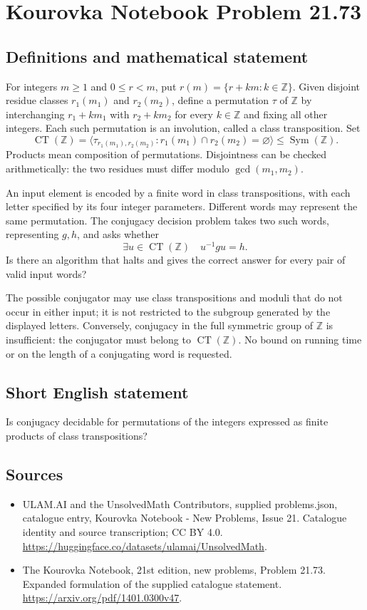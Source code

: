 \documentclass[11pt,a4paper]{article}
\begin{document}
\section*{Kourovka Notebook Problem 21.73}\label{statement}

\subsection{Definitions and mathematical statement}
For integers $m\ge1$ and $0\le r<m$, put
$r(m)=\{r+km:k\in\mathbb Z\}$. Given disjoint residue classes
$r_1(m_1)$ and $r_2(m_2)$, define a permutation $\tau$ of $\mathbb Z$
by interchanging $r_1+km_1$ with $r_2+km_2$ for every $k\in\mathbb Z$
and fixing all other integers. Each such permutation is an involution,
called a class transposition. Set
\[
 \operatorname{CT}(\mathbb Z)
  =\langle\tau_{r_1(m_1),r_2(m_2)}:
                      r_1(m_1)\cap r_2(m_2)=\varnothing\rangle
  \le\operatorname{Sym}(\mathbb Z).
\]
Products mean composition of permutations. Disjointness can be checked
arithmetically: the two residues must differ modulo
$\gcd(m_1,m_2)$.

An input element is encoded by a finite word in class transpositions,
with each letter specified by its four integer parameters. Different
words may represent the same permutation. The conjugacy decision
problem takes two such words, representing $g,h$, and asks whether
\[
 \exists u\in\operatorname{CT}(\mathbb Z)\quad u^{-1}gu=h.
\]
Is there an algorithm that halts and gives the correct answer for
every pair of valid input words?

The possible conjugator may use class transpositions and moduli that
do not occur in either input; it is not restricted to the subgroup
generated by the displayed letters. Conversely, conjugacy in the full
symmetric group of $\mathbb Z$ is insufficient: the conjugator must
belong to $\operatorname{CT}(\mathbb Z)$. No bound on running time or
on the length of a conjugating word is requested.
\subsection{Short English statement}
Is conjugacy decidable for permutations of the integers expressed as finite products of class transpositions?
\subsection{Sources}
\begin{itemize}
\item[S1] ULAM.AI and the UnsolvedMath Contributors, supplied problems.json, catalogue entry, Kourovka Notebook - New Problems, Issue 21. Catalogue identity and source transcription; CC BY 4.0.
\url{https://huggingface.co/datasets/ulamai/UnsolvedMath}.
\item[S2] The Kourovka Notebook, 21st edition, new problems, Problem 21.73. Expanded formulation of the supplied catalogue statement.
\url{https://arxiv.org/pdf/1401.0300v47}.
\end{itemize}
\end{document}
